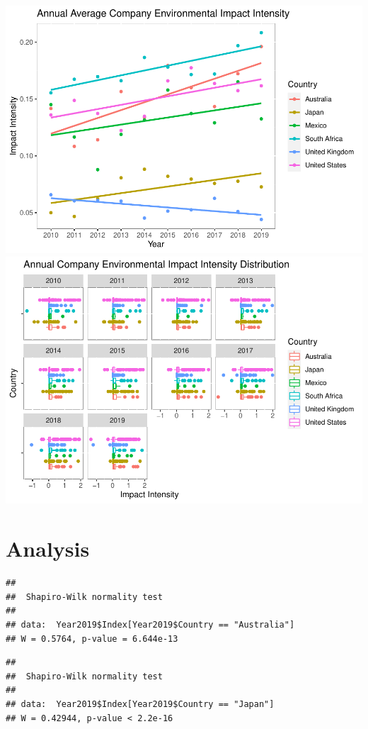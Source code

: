 \documentclass[
  12pt,
]{article}
\begin{document}
\includegraphics{QiuWangXu_ENV872_Finalproject_files/figure-latex/unnamed-chunk-3-1.pdf}
\includegraphics{QiuWangXu_ENV872_Finalproject_files/figure-latex/unnamed-chunk-3-2.pdf}

\newpage

\hypertarget{analysis}{%
\section{Analysis}\label{analysis}}

\begin{verbatim}
## 
##  Shapiro-Wilk normality test
## 
## data:  Year2019$Index[Year2019$Country == "Australia"]
## W = 0.5764, p-value = 6.644e-13
\end{verbatim}

\begin{verbatim}
## 
##  Shapiro-Wilk normality test
## 
## data:  Year2019$Index[Year2019$Country == "Japan"]
## W = 0.42944, p-value < 2.2e-16
\end{verbatim}
\end{document}
